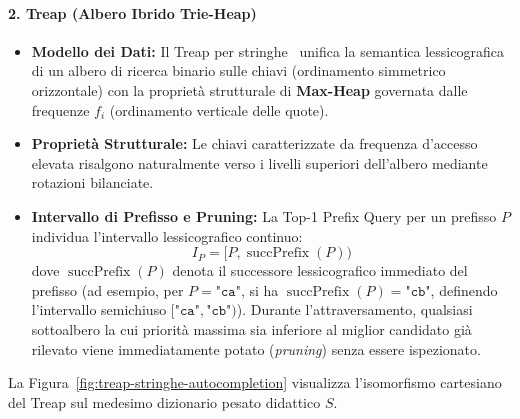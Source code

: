 \paragraph{2. Treap (Albero Ibrido Trie-Heap)}
\begin{itemize}
  \item \textbf{Modello dei Dati:} Il Treap per stringhe~\cite{seidel1996} unifica la semantica lessicografica di un albero di ricerca binario sulle chiavi (ordinamento simmetrico orizzontale) con la propriet\`a strutturale di \textbf{Max-Heap} governata dalle frequenze $f_i$ (ordinamento verticale delle quote).
  \item \textbf{Propriet\`a Strutturale:} Le chiavi caratterizzate da frequenza d'accesso elevata risalgono naturalmente verso i livelli superiori dell'albero mediante rotazioni bilanciate.
  \item \textbf{Intervallo di Prefisso e Pruning:} La Top-1 Prefix Query per un prefisso $P$ individua l'intervallo lessicografico continuo:
  \begin{equation}
    I_P = [P, \operatorname{succPrefix}(P))
  \end{equation}
  dove $\operatorname{succPrefix}(P)$ denota il successore lessicografico immediato del prefisso (ad esempio, per $P = \texttt{"ca"}$, si ha $\operatorname{succPrefix}(P) = \texttt{"cb"}$, definendo l'intervallo semichiuso $[\texttt{"ca"}, \texttt{"cb"})$). Durante l'attraversamento, qualsiasi sottoalbero la cui priorit\`a massima sia inferiore al miglior candidato gi\`a rilevato viene immediatamente potato (\textit{pruning}) senza essere ispezionato.
\end{itemize}

La Figura~\ref{fig:treap-stringhe-autocompletion} visualizza l'isomorfismo cartesiano del Treap sul medesimo dizionario pesato didattico $S$.

